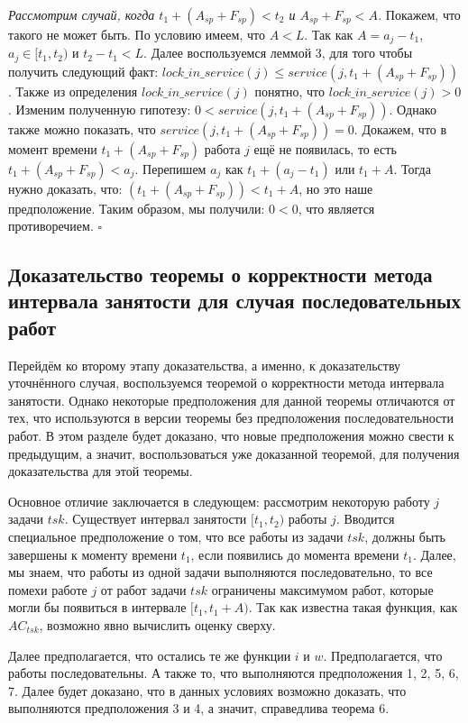 \textit{Рассмотрим случай, когда $t_1 + (A_{sp} + F_{sp}) < t_2$ и $A_{sp} + F_{sp} < A$.}
    Покажем, что такого не может быть.
    По условию имеем, что $A < L$. Так как $A = a_j - t_1$, $a_j \in [t_1, t_2)$ и $t_2 - t_1 < L$.
    Далее воспользуемся леммой 3, для того чтобы получить следующий факт:
      $lock\_in\_service(j) \leq service(j, t_1 + (A_{sp} + F_{sp}))$.
    Также из определения $lock\_in\_service (j)$ понятно, что $lock\_in\_service( j) > 0$. Изменим
      полученную гипотезу: $0 < service(j, t_1 + (A_{sp} + F_{sp}))$.
    Однако также можно показать, что $service(j, t_1 + (A_{sp} + F_{sp})) = 0$. Докажем, что
      в момент времени $t_1 + (A_{sp} + F_{sp})$ работа $j$ ещё не появилась, то есть $t_1 + (A_{sp} + F_{sp}) < a_j$.
    Перепишем $a_j$ как $t_1 + (a_j - t_1)$ или $t_1 + A$.
    Тогда нужно доказать, что: $(t_1 + (A_{sp} + F_{sp})) < t_1 + A$, но это наше предположение.
    Таким образом, мы получили: $0 < 0$, что является противоречием.
 $\square$

\subsection{Доказательство теоремы о корректности метода интервала занятости для случая последовательных работ}

Перейдём ко второму этапу доказательства, а именно, к доказательству уточнённого случая,
  воспользуемся теоремой о корректности метода интервала занятости. Однако
  некоторые предположения для данной теоремы отличаются от тех, что используются
  в версии теоремы без предположения последовательности работ. В этом разделе будет доказано,
  что новые предположения можно свести к предыдущим, а значит, воспользоваться уже доказанной теоремой,
  для получения доказательства для этой теоремы.

Основное отличие заключается в следующем: рассмотрим некоторую работу $j$ задачи $tsk$.
  Существует интервал занятости $[t_1,t_2)$ работы $j$. Вводится специальное предположение о том,
  что все работы из задачи $tsk$, должны быть завершены к моменту времени $t_1$, если
  появились до момента времени $t_1$. Далее, мы знаем, что работы из одной задачи
  выполняются последовательно, то все помехи работе $j$ от работ задачи $tsk$
  ограничены максимумом работ, которые могли бы появиться в интервале $[t_1, t_1 + A)$.
  Так как известна такая функция, как $AC_{tsk}$, возможно явно вычислить оценку сверху.

Далее предполагается, что остались те же функции $i$ и $w$. Предполагается, что работы последовательны.
  А также то, что выполняются предположения 1, 2, 5, 6, 7. Далее будет доказано,
  что в данных условиях возможно доказать, что выполняются предположения 3 и 4,
  а значит, справедлива теорема 6.

